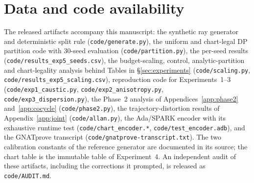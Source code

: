 \documentclass[11pt]{article}
\begin{document}
\section*{Data and code availability}
The released artifacts accompany this manuscript: the synthetic ray generator and
deterministic split rule (\texttt{code/generate.py}), the uniform and chart-legal DP
partition code with 30-seed evaluation (\texttt{code/partition.py}), the per-seed
results (\texttt{code/results\_exp5\_seeds.csv}), the budget-scaling, control, analytic-partition
and chart-legality analysis behind Tables in \S\ref{sec:experiments}
(\texttt{code/scaling.py}, \texttt{code/results\_exp5\_scaling.csv}), reproduction code for
Experiments~1--3 (\texttt{code/exp1\_caustic.py}, \texttt{code/exp2\_anisotropy.py},
\texttt{code/exp3\_dispersion.py}), the Phase~2 analysis of Appendices~\ref{app:phase2}
and~\ref{app:cocycle} (\texttt{code/phase2.py}), the trajectory-distortion results of
Appendix~\ref{app:joint} (\texttt{code/allan.py}), the Ada/SPARK encoder with its
exhaustive runtime test (\texttt{code/chart\_encoder.*}, \texttt{code/test\_encoder.adb}),
and the GNATprove transcript (\texttt{code/gnatprove-transcript.txt}). The two
calibration constants of the reference generator are documented in its source; the
chart table is the immutable table of Experiment~4. An independent audit of these
artifacts, including the corrections it prompted, is released as
\texttt{code/AUDIT.md}.



\end{document}
